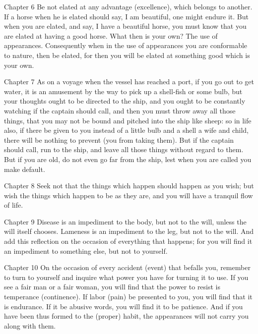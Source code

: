Chapter 6 Be not elated at any advantage (excellence), which belongs to another. If a horse when he is elated should say, I am beautiful, one might endure it. But when you are elated, and say, I have a beautiful horse, you must know that you are elated at having a good horse. What then is your own? The use of appearances. Consequently when in the use of appearances you are conformable to nature, then be elated, for then you will be elated at something good which is your own.



Chapter 7 As on a voyage when the vessel has reached a port, if you go out to get water, it is an amusement by the way to pick up a shell-fish or some bulb, but your thoughts ought to be directed to the ship, and you ought to be constantly watching if the captain should call, and then you must throw away all those things, that you may not be bound and pitched into the ship like sheep: so in life also, if there be given to you instead of a little bulb and a shell a wife and child, there will be nothing to prevent (you from taking them). But if the captain should call, run to the ship, and leave all those things without regard to them. But if you are old, do not even go far from the ship, lest when you are called you make default.



Chapter 8 Seek not that the things which happen should happen as you wish; but wish the things which happen to be as they are, and you will have a tranquil flow of life.



Chapter 9 Disease is an impediment to the body, but not to the will, unless the will itself chooses. Lameness is an impediment to the leg, but not to the will. And add this reflection on the occasion of everything that happens; for you will find it an impediment to something else, but not to yourself.



Chapter 10 On the occasion of every accident (event) that befalls you, remember to turn to yourself and inquire what power you have for turning it to use. If you see a fair man or a fair woman, you will find that the power to resist is temperance (continence). If labor (pain) be presented to you, you will find that it is endurance. If it be abusive words, you will find it to be patience. And if you have been thus formed to the (proper) habit, the appearances will not carry you along with them.




